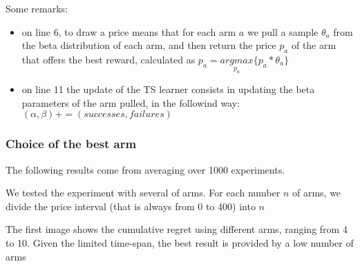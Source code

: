 Some remarks:
\begin{itemize}
    \item on line 6, to draw a price means that for each arm $a$ we pull a sample $\theta_a$ from the beta distribution of each arm, and then return the price $p_a$ of the arm that offers the best reward, calculated as $p_a = \underset{p_a}{argmax} \{p_a * \theta_a\}$
    \item on line 11 the update of the TS learner consists in updating the beta parameters of the arm pulled, in the followind way: $(\alpha, \beta) += (successes, failures)$
\end{itemize}

\subsubsection{Choice of the best arm}
The following results come from averaging over 1000 experiments.

We tested the experiment with several of arms. For each number $n$ of arms, we divide the price interval (that is always from 0 to 400) into $n$

The first image shows the cumulative regret using different arms, ranging from 4 to 10.
Given the limited time-span, the best result is provided by a low number of arms 
